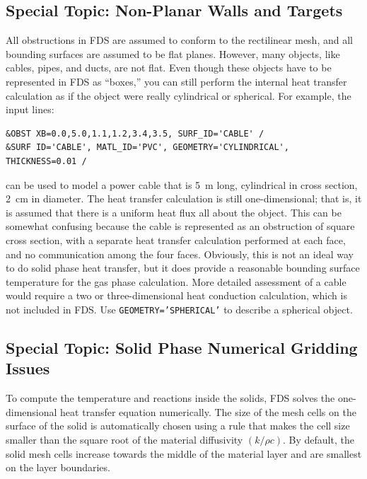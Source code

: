 \documentclass[11pt]{book}
\newcommand{\ct}{\tt\small}
\begin{document}
\subsection{Special Topic: Non-Planar Walls and Targets}

\label{info:GEOMETRY}

All obstructions in FDS are assumed to conform to the rectilinear
mesh, and all bounding surfaces are assumed to be flat
planes. However, many objects, like cables, pipes, and ducts, are not
flat. Even though these objects have to be represented in FDS as
``boxes,'' you can still perform the internal heat transfer
calculation as if the object were really cylindrical or spherical. For
example, the input lines:

\footnotesize
\begin{verbatim}
&OBST XB=0.0,5.0,1.1,1.2,3.4,3.5, SURF_ID='CABLE' /
&SURF ID='CABLE', MATL_ID='PVC', GEOMETRY='CYLINDRICAL', THICKNESS=0.01 /
\end{verbatim} \normalsize

\noindent
can be used to model a power cable that is 5~m long, cylindrical in
cross section, 2~cm in diameter. The heat transfer calculation is
still one-dimensional; that is, it is assumed that there is a uniform
heat flux all about the object. This can be somewhat confusing because
the cable is represented as an obstruction of square cross section,
with a separate heat transfer calculation performed at each face, and
no communication among the four faces. Obviously, this is not an ideal
way to do solid phase heat transfer, but it does provide a reasonable
bounding surface temperature for the gas phase calculation. More
detailed assessment of a cable would require a two or
three-dimensional heat conduction calculation, which is not included
in FDS. Use {\ct GEOMETRY='SPHERICAL'} to describe a spherical object.


\subsection{Special Topic: Solid Phase Numerical Gridding Issues}
\label{info:solid_phase_stability}

To compute the temperature and reactions inside the solids, FDS solves
the one-dimensional heat transfer equation numerically. The size of
the mesh cells on the surface of the solid is automatically chosen
using a rule that makes the cell size smaller than the square root of
the material diffusivity $(k/\rho c)$. By default, the solid mesh
cells increase towards the middle of the material layer and are smallest
on the layer boundaries.
\end{document}
